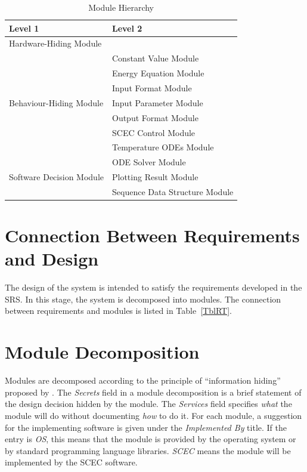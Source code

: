 \documentclass[12pt, titlepage]{article}
\begin{document}
\begin{table}[h!]
\centering
\begin{tabular}{p{} p{}}
\toprule
\textbf{Level 1} & \textbf{Level 2}\\
\midrule
{Hardware-Hiding Module} & ~ \\
\midrule

\multirow{7}{0.3\textwidth}{Behaviour-Hiding Module} 
& Constant Value Module\\ 
& Energy Equation Module\\
& Input Format Module\\
& Input Parameter Module\\
& Output Format Module\\
& SCEC Control Module\\
& Temperature ODEs Module\\
\midrule

\multirow{3}{0.3\textwidth}{Software Decision Module} 
& ODE Solver Module\\
& Plotting Result Module\\
& Sequence Data Structure Module\\
\bottomrule

\end{tabular}
\caption{Module Hierarchy}
\label{TblMH}
\end{table}

\section{Connection Between Requirements and Design} \label{SecConnection}

The design of the system is intended to satisfy the requirements developed in
the SRS. In this stage, the system is decomposed into modules. The connection
between requirements and modules is listed in Table~\ref{TblRT}.

\section{Module Decomposition} \label{SecMD}

Modules are decomposed according to the principle of ``information hiding''
proposed by \citet{ParnasEtAl1984}. The \emph{Secrets} field in a module
decomposition is a brief statement of the design decision hidden by the
module. The \emph{Services} field specifies \emph{what} the module will do
without documenting \emph{how} to do it. For each module, a suggestion for the
implementing software is given under the \emph{Implemented By} title. If the
entry is \emph{OS}, this means that the module is provided by the operating
system or by standard programming language libraries.  \emph{SCEC} means the
module will be implemented by the SCEC software.
\end{document}
